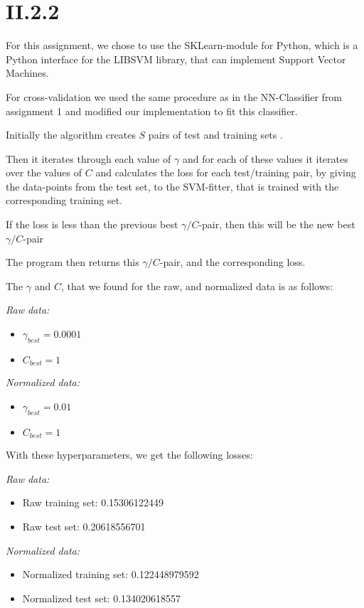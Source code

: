 \documentclass[12pt, a4paper]{article}
\begin{document}
\section{II.2.2}
For this assignment, we chose to use the SKLearn-module for Python, which is a Python interface for the LIBSVM library, that can implement Support Vector Machines.

For cross-validation we used the same procedure as in the NN-Classifier from assignment 1 and modified our implementation to fit this classifier.

Initially the algorithm creates $S$ pairs of test and training sets .

Then it iterates through each value of $\gamma$ and for each of these values it iterates over the values of $C$ and calculates the loss for each test/training pair, by giving the data-points from the test set, to the SVM-fitter, that is trained with the corresponding training set.

If the loss is less than the previous best $\gamma/C$-pair, then this will be the new best $\gamma/C$-pair

The program then returns this $\gamma/C$-pair, and the corresponding loss.

The $\gamma$ and $C$, that we found for the raw, and normalized data is as follows:

\textit{Raw data:}
\begin{itemize}
	\item $\gamma_{best} = 0.0001$
	\item $C_{best} = 1$
\end{itemize}

\textit{Normalized data:}
\begin{itemize}
	\item $\gamma_{best} = 0.01$
	\item $C_{best} = 1$
\end{itemize}

With these hyperparameters, we get the following losses:

\textit{Raw data:}
\begin{itemize}
	\item Raw training set: 0.15306122449
	\item Raw test set: 0.20618556701
\end{itemize}

\textit{Normalized data:}
\begin{itemize}
	\item Normalized training set: 0.122448979592
	\item Normalized test set: 0.134020618557
\end{itemize}
\end{document}
